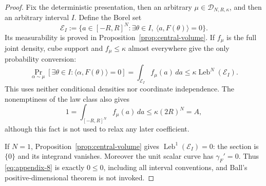 \begin{proof}
Fix the deterministic presentation, then an arbitrary
$\mu\in\mathcal D_{N,R,\kappa}$, and then an arbitrary interval $I$.  Define
the Borel set
\[
\mathcal E_I:=\{a\in[-R,R]^N:\exists\theta\in I,
 \ \langle a,F(\theta)\rangle=0\}.
\]
Its measurability is proved in Proposition~\ref{prop:central-volume}.  If
$f_\mu$ is the full joint density, cube support and
$f_\mu\leq\kappa$ almost everywhere give the only probability conversion:
\begin{equation}
\Pr_{\alpha\sim\mu}
[\exists\theta\in I:\langle\alpha,F(\theta)\rangle=0]
=\int_{\mathcal E_I}f_\mu(a)\,da
\leq\kappa\operatorname{Leb}^N(\mathcal E_I).
\label{eq:appendix-9}
\end{equation}
This uses neither conditional densities nor coordinate independence.  The
nonemptiness of the law class also gives
\[
1=\int_{[-R,R]^N}f_\mu(a)\,da
\leq\kappa(2R)^N=A,
\]
although this fact is not used to relax any later coefficient.

If $N=1$, Proposition~\ref{prop:central-volume} gives
$\operatorname{Leb}^1(\mathcal E_I)=0$: the section is $\{0\}$ and its
integrand vanishes.  Moreover the unit scalar curve has
$\gamma_F'=0$.  Thus \eqref{eq:appendix-8} is exactly $0\leq0$, including all interval
conventions, and Ball's positive-dimensional theorem is not invoked.


\end{proof}
